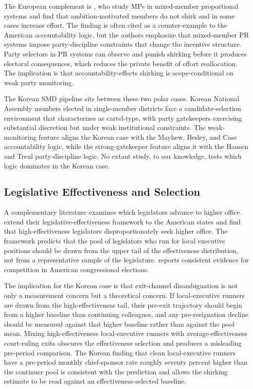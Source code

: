 \documentclass[11pt]{article}
\begin{document}
The European complement is \citet{hansen2015}, who study MPs in mixed-member proportional systems and find that ambition-motivated members do not shirk and in some cases increase effort. The \citet{hansen2015} finding is often cited as a counter-example to the American accountability logic, but the authors emphasize that mixed-member PR systems impose party-discipline constraints that change the incentive structure. Party selectors in PR systems can observe and punish shirking before it produces electoral consequences, which reduces the private benefit of effort reallocation. The implication is that accountability-effects shirking is scope-conditional on weak party monitoring.

The Korean SMD pipeline sits between these two polar cases. Korean National Assembly members elected in single-member districts face a candidate-selection environment that \citet{yoon2022} characterizes as cartel-type, with party gatekeepers exercising substantial discretion but under weak institutional constraints. The weak-monitoring feature aligns the Korean case with the Mayhew, Besley, and Case accountability logic, while the strong-gatekeeper feature aligns it with the Hansen and Treul party-discipline logic. No extant study, to our knowledge, tests which logic dominates in the Korean case.

\subsection{Legislative Effectiveness and Selection}

A complementary literature examines which legislators advance to higher office. \citet{volden2024} extend their legislative-effectiveness framework to the American states and find that high-effectiveness legislators disproportionately seek higher office. The framework predicts that the pool of legislators who run for local executive positions should be drawn from the upper tail of the effectiveness distribution, not from a representative sample of the legislature. \citet{thomsen2022} reports consistent evidence for competition in American congressional elections.

The implication for the Korean case is that exit-channel disambiguation is not only a measurement concern but a theoretical concern. If local-executive runners are drawn from the high-effectiveness tail, their pre-exit trajectory should begin from a higher baseline than continuing colleagues, and any pre-resignation decline should be measured against that higher baseline rather than against the pool mean. Mixing high-effectiveness local-executive runners with average-effectiveness court-ruling exits obscures the effectiveness selection and produces a misleading pre-period comparison. The Korean finding that clean local-executive runners have a pre-period monthly chief-sponsor rate roughly seventy percent higher than the continuer pool is consistent with the \citet{volden2024} prediction and allows the shirking estimate to be read against an effectiveness-selected baseline.
\end{document}
